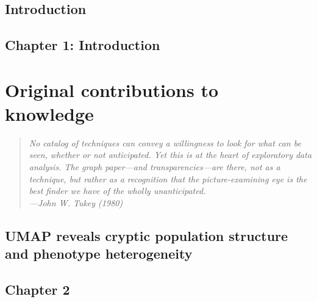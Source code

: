 \documentclass[12pt, TexShade, letterpaper]{report}
\makeatletter
\newcommand{\unchapter}[1]{%
  \begingroup
  \let\@makechapterhead\@gobble %
  \chapter{#1}
  \endgroup
}
\makeatother
\begin{document}
\vfill
\hspace{0pt}
\pagebreak

\unchapter{Introduction}
\chapter*{Chapter 1: Introduction}


%
%

\part{Original contributions to knowledge}
\label{part:manuscripts}

\pagebreak
\hspace{0pt}
\vfill

\begin{center}
\begin{quote} 
\begin{singlespace}
\textit{No catalog of techniques can convey a willingness to look for what can be seen, whether or not anticipated. Yet this is at the heart of exploratory data analysis. The graph paper---and transparencies---are there, not as a technique, but rather as a recognition that the picture-examining eye is the best finder we have of the wholly unanticipated. \\
---John W. Tukey (1980)}
\end{singlespace}
\end{quote}
\end{center}

\vfill
\hspace{0pt}
\pagebreak


\begin{refsection}
\unchapter{UMAP reveals cryptic population structure and phenotype heterogeneity}
\chapter*{Chapter 2}
\label{chap:chapter2}


\cleardoublepage
{}
\begin{singlespace}
\printbibliography[heading=subbibintoc]
\end{singlespace}
\end{refsection}
\end{document}
